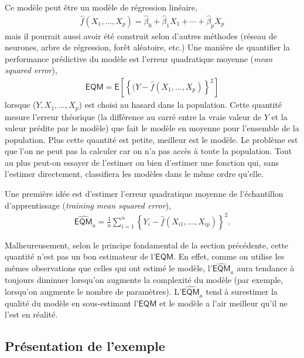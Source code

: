 \documentclass[
  11pt,
  letterpaper,
]{scrbook}
\theoremstyle{definition}
\theoremstyle{remark}
\begin{document}
Ce modèle peut être un modèle de régression linéaire, \begin{align*}
\widehat{f}(X_1, \ldots, X_p) = \widehat{\beta}_0 + \widehat{\beta}_1X_1 + \cdots + \widehat{\beta}_pX_p
\end{align*} mais il pourrait aussi avoir été construit selon d'autres
méthodes (réseau de neurones, arbre de régression, forêt aléatoire,
etc.) Une manière de quantifier la performance prédictive du modèle est
l'erreur quadratique moyenne (\emph{mean squared error}), \begin{align*}
\mathsf{EQM}=\mathsf{E}\left[\left\{(Y-\widehat{f}(X_1, \ldots, X_p)\right\}^2\right]
\end{align*} lorsque (\(Y, X_1, \ldots, X_p\)) est choisi au hasard dans
la population. Cette quantité mesure l'erreur théorique (la différence
au carré entre la vraie valeur de \(Y\) et la valeur prédite par le
modèle) que fait le modèle en moyenne pour l'ensemble de la population.
Plus cette quantité est petite, meilleur est le modèle. Le problème est
que l'on ne peut pas la calculer car on n'a pas accès à toute la
population. Tout au plus peut-on essayer de l'estimer ou bien d'estimer
une fonction qui, sans l'estimer directement, classifiera les modèles
dans le même ordre qu'elle.

Une première idée est d'estimer l'erreur quadratique moyenne de
l'échantillon d'apprentissage (\emph{training mean squared error}),
\begin{align*}
\widehat{\mathsf{EQM}}_a= \frac{1}{n}\sum_{i=1}^n \left\{Y_i-\widehat{f}(X_{i1}, \ldots, X_{ip})\right\}^2.
\end{align*}

Malheureusement, selon le principe fondamental de la section précédente,
cette quantité n'est pas un bon estimateur de l'\(\mathsf{EQM}\). En
effet, comme on utilise les mêmes observations que celles qui ont estimé
le modèle, l'\(\widehat{\mathsf{EQM}}_a\) aura tendance à toujours
diminuer lorsqu'on augmente la complexité du modèle (par exemple,
lorsqu'on augmente le nombre de paramètres).
L'\(\widehat{\mathsf{EQM}}_a\) tend à surestimer la qualité du modèle en
sous-estimant l'\(\mathsf{EQM}\) et le modèle a l'air meilleur qu'il ne
l'est en réalité.

\hypertarget{pruxe9sentation-de-lexemple}{%
\subsection{Présentation de
l'exemple}\label{pruxe9sentation-de-lexemple}}
\end{document}
